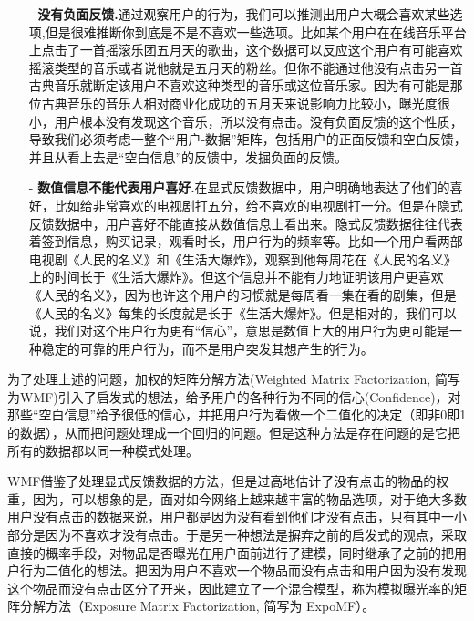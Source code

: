 \documentclass[notitlepage,cs4size,punct,oneside]{ctexrep}
\numberwithin{equation}{chapter}
\theoremstyle{mystyle}
\begin{document}
\begin{itemize}
\item[-] \textbf{没有负面反馈.}通过观察用户的行为，我们可以推测出用户大概会喜欢某些选项,但是很难推断你到底是不是不喜欢一些选项。比如某个用户在在线音乐平台上点击了一首摇滚乐团五月天的歌曲，这个数据可以反应这个用户有可能喜欢摇滚类型的音乐或者说他就是五月天的粉丝。但你不能通过他没有点击另一首古典音乐就断定该用户不喜欢这种类型的音乐或这位音乐家。因为有可能是那位古典音乐的音乐人相对商业化成功的五月天来说影响力比较小，曝光度很小，用户根本没有发现这个音乐，所以没有点击。没有负面反馈的这个性质，导致我们必须考虑一整个“用户-数据”矩阵，包括用户的正面反馈和空白反馈，并且从看上去是“空白信息”的反馈中，发掘负面的反馈。
\item[-] \textbf{数值信息不能代表用户喜好.}在显式反馈数据中，用户明确地表达了他们的喜好，比如给非常喜欢的电视剧打五分，给不喜欢的电视剧打一分。但是在隐式反馈数据中，用户喜好不能直接从数值信息上看出来。隐式反馈数据往往代表着签到信息，购买记录，观看时长，用户行为的频率等。比如一个用户看两部电视剧《人民的名义》和《生活大爆炸》，观察到他每周花在《人民的名义》上的时间长于《生活大爆炸》。但这个信息并不能有力地证明该用户更喜欢《人民的名义》，因为也许这个用户的习惯就是每周看一集在看的剧集，但是《人民的名义》每集的长度就是长于《生活大爆炸》。但是相对的，我们可以说，我们对这个用户行为更有“信心”，意思是数值上大的用户行为更可能是一种稳定的可靠的用户行为，而不是用户突发其想产生的行为。
\end{itemize}

\par
为了处理上述的问题，加权的矩阵分解方法\cite{WMF}(Weighted Matrix Factorization, 简写为WMF)引入了启发式的想法，给予用户的各种行为不同的信心(Confidence)，对那些“空白信息”给予很低的信心，并把用户行为看做一个二值化的决定（即非0即1的数据），从而把问题处理成一个回归的问题。但是这种方法是存在问题的是它把所有的数据都以同一种模式处理。
\par
WMF借鉴了处理显式反馈数据的方法，但是过高地估计了没有点击的物品的权重，因为，可以想象的是，面对如今网络上越来越丰富的物品选项，对于绝大多数用户没有点击的数据来说，用户都是因为没有看到他们才没有点击，只有其中一小部分是因为不喜欢才没有点击。于是另一种想法\cite{EXPOMF}是摒弃之前的启发式的观点，采取直接的概率手段，对物品是否曝光在用户面前进行了建模，同时继承了之前的把用户行为二值化的想法。把因为用户不喜欢一个物品而没有点击和用户因为没有发现这个物品而没有点击区分了开来，因此建立了一个混合模型，称为模拟曝光率的矩阵分解方法（Exposure Matrix Factorization, 简写为 ExpoMF）。
\end{document}
